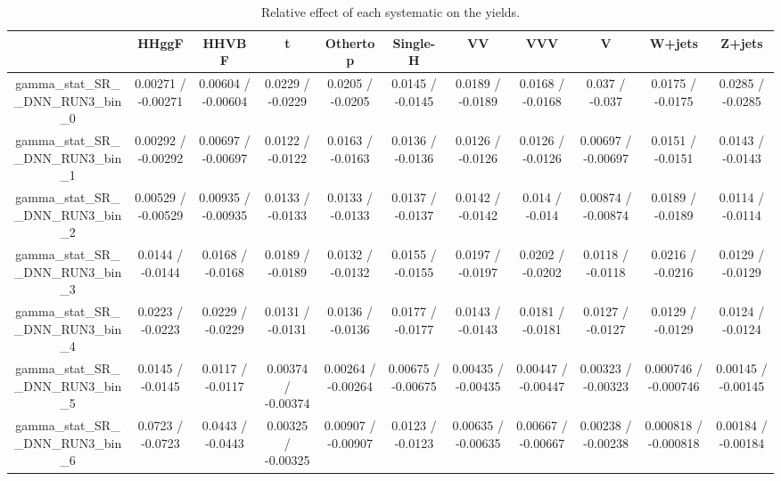 \documentclass[10pt]{article}
\begin{document}
\begin{table}[htbp]
\begin{center}
\begin{tabular}{|c|c|c|c|c|c|c|c|c|c|c|}
\hline 
      & HHggF      & HHVBF      & t      & Othertop      & Single-H      & VV      & VVV      & V      & W+jets      & Z+jets \\ 
\hline 
  gamma_stat_SR__DNN_RUN3_bin_0 & 0.00271 / -0.00271 & 0.00604 / -0.00604 & 0.0229 / -0.0229 & 0.0205 / -0.0205 & 0.0145 / -0.0145 & 0.0189 / -0.0189 & 0.0168 / -0.0168 & 0.037 / -0.037 & 0.0175 / -0.0175 & 0.0285 / -0.0285 \\ 
  gamma_stat_SR__DNN_RUN3_bin_1 & 0.00292 / -0.00292 & 0.00697 / -0.00697 & 0.0122 / -0.0122 & 0.0163 / -0.0163 & 0.0136 / -0.0136 & 0.0126 / -0.0126 & 0.0126 / -0.0126 & 0.00697 / -0.00697 & 0.0151 / -0.0151 & 0.0143 / -0.0143 \\ 
  gamma_stat_SR__DNN_RUN3_bin_2 & 0.00529 / -0.00529 & 0.00935 / -0.00935 & 0.0133 / -0.0133 & 0.0133 / -0.0133 & 0.0137 / -0.0137 & 0.0142 / -0.0142 & 0.014 / -0.014 & 0.00874 / -0.00874 & 0.0189 / -0.0189 & 0.0114 / -0.0114 \\ 
  gamma_stat_SR__DNN_RUN3_bin_3 & 0.0144 / -0.0144 & 0.0168 / -0.0168 & 0.0189 / -0.0189 & 0.0132 / -0.0132 & 0.0155 / -0.0155 & 0.0197 / -0.0197 & 0.0202 / -0.0202 & 0.0118 / -0.0118 & 0.0216 / -0.0216 & 0.0129 / -0.0129 \\ 
  gamma_stat_SR__DNN_RUN3_bin_4 & 0.0223 / -0.0223 & 0.0229 / -0.0229 & 0.0131 / -0.0131 & 0.0136 / -0.0136 & 0.0177 / -0.0177 & 0.0143 / -0.0143 & 0.0181 / -0.0181 & 0.0127 / -0.0127 & 0.0129 / -0.0129 & 0.0124 / -0.0124 \\ 
  gamma_stat_SR__DNN_RUN3_bin_5 & 0.0145 / -0.0145 & 0.0117 / -0.0117 & 0.00374 / -0.00374 & 0.00264 / -0.00264 & 0.00675 / -0.00675 & 0.00435 / -0.00435 & 0.00447 / -0.00447 & 0.00323 / -0.00323 & 0.000746 / -0.000746 & 0.00145 / -0.00145 \\ 
  gamma_stat_SR__DNN_RUN3_bin_6 & 0.0723 / -0.0723 & 0.0443 / -0.0443 & 0.00325 / -0.00325 & 0.00907 / -0.00907 & 0.0123 / -0.0123 & 0.00635 / -0.00635 & 0.00667 / -0.00667 & 0.00238 / -0.00238 & 0.000818 / -0.000818 & 0.00184 / -0.00184 \\ 
\hline 
\end{tabular} 
\caption{Relative effect of each systematic on the yields.} 
\end{center} 
\end{table} 
\end{document}
